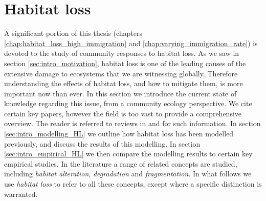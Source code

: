 
%
%
%


\section{Habitat loss}
\label{sec:intro_habitat_loss}

A significant portion of this thesis (chapters \ref{chap:habitat_loss_high_immigration} and \ref{chap:varying_immigration_rate}) is devoted to the study of community responses to habitat loss. As we saw in section \ref{sec:intro_motivation}, habitat loss is one of the leading causes of the extensive damage to ecosystems that we are witnessing globally. Therefore understanding the effects of habitat loss, and how to mitigate them, is more important now than ever. In this section we introduce the current state of knowledge regarding this issue, from a community ecology perspective. We cite certain key papers, however the field is too vast to provide a comprehensive overview. The reader is referred to reviews in \cite{hagen2012biodiversity} and \cite{gonzalez2011disentangled} for such information. In section \ref{sec:intro_modelling_HL} we outline how habitat loss has been modelled previously, and discuss the results of this modelling. In section \ref{sec:intro_empirical_HL} we then compare the modelling results to certain key empirical studies. In the literature a range of related concepts are studied, including \emph{habitat alteration}, \emph{degradation} and \emph{fragmentation}. In what follows we use \emph{habitat loss} to refer to all these concepts, except where a specific distinction is warranted.


